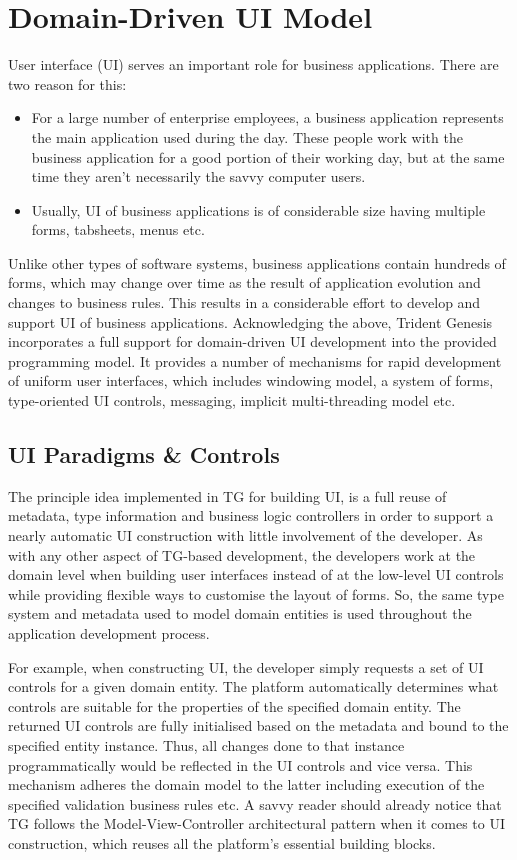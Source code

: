\section{Domain-Driven UI Model}\label{sec:05}

  User interface (UI) serves an important role for business applications.
  There are two reason for this:
  \begin{itemize}
   \item For a large number of enterprise employees, a business application represents the main application used during the day. 
	 These people work with the business application for a good portion of their working day, but at the same time they aren't necessarily the savvy computer users.
   \item Usually, UI of business applications is of considerable size having multiple forms, tabsheets, menus etc.
  \end{itemize}
  Unlike other types of software systems, business applications contain hundreds of forms, which may change over time as the result of application evolution and changes to business rules.
  This results in a considerable effort to develop and support UI of business applications.
  Acknowledging the above, Trident Genesis incorporates a full support for domain-driven UI development into the provided programming model.
  It provides a number of mechanisms for rapid development of uniform user interfaces, which includes windowing model, a system of forms, type-oriented UI controls, messaging, implicit multi-threading model etc.
  
  \subsection{UI Paradigms \& Controls}
  The principle idea implemented in TG for building UI, is a full reuse of metadata, type information and business logic controllers in order to support a nearly automatic UI construction with little involvement of the developer.
  As with any other aspect of TG-based development, the developers work at the domain level when building user interfaces instead of at the low-level UI controls while providing flexible ways to customise the layout of forms.
  So, the same type system and metadata used to model domain entities is used throughout the application development process.
  
  For example, when constructing UI, the developer simply requests a set of UI controls for a given domain entity.
  The platform automatically determines what controls are suitable for the properties of the specified domain entity.
  The returned UI controls are fully initialised based on the metadata and bound to the specified entity instance.
  Thus, all changes done to that instance programmatically would be reflected in the UI controls and vice versa.
  This mechanism adheres the domain model to the latter including execution of the specified validation business rules etc.
  A savvy reader should already notice that TG follows the Model-View-Controller architectural pattern when it comes to UI construction, which reuses all the platform's essential building blocks.

